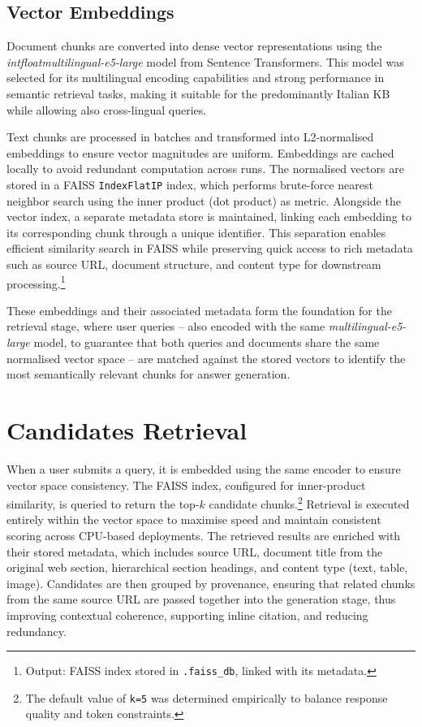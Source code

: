 \begin{spacing}{1.5}
\sloppy
\subsection{Vector Embeddings}
Document chunks are converted into dense vector representations using the \textit{intfloat\/multilingual-e5-large} model from Sentence Transformers. This model was selected for its multilingual encoding capabilities and strong performance in semantic retrieval tasks, making it suitable for the predominantly Italian KB while allowing also cross-lingual queries. 

Text chunks are processed in batches and transformed into L2-normalised embeddings to ensure vector magnitudes are uniform. Embeddings are cached locally to avoid redundant computation across runs. The normalised vectors are stored in a FAISS \texttt{IndexFlatIP} index, which performs brute-force nearest neighbor search using the inner product (dot product) as metric. Alongside the vector index, a separate metadata store is maintained, linking each embedding to its corresponding chunk through a unique identifier. This separation enables efficient similarity search in FAISS while preserving quick access to rich metadata such as source URL, document structure, and content type for downstream processing.\footnote{Output: FAISS index stored in \texttt{.faiss\_db}, linked with its metadata.}

These embeddings and their associated metadata form the foundation for the retrieval stage, where user queries -- also encoded with the same \textit{multilingual-e5-large} model, to guarantee that both queries and documents share the same normalised vector space -- are matched against the stored vectors to identify the most semantically relevant chunks for answer generation.

\section{Candidates Retrieval}
When a user submits a query, it is embedded using the same encoder to ensure vector space consistency. The FAISS index, configured for inner-product similarity, is queried to return the top-$k$ candidate chunks.\footnote{The default value of \texttt{k=5} was determined empirically to balance response quality and token constraints.} Retrieval is executed entirely within the vector space to maximise speed and maintain consistent scoring across CPU-based deployments. The retrieved results are enriched with their stored metadata, which includes source URL, document title from the original web section, hierarchical section headings, and content type (text, table, image). Candidates are then grouped by provenance, ensuring that related chunks from the same source URL are passed together into the generation stage, thus improving contextual coherence, supporting inline citation, and reducing redundancy.


\end{spacing}
